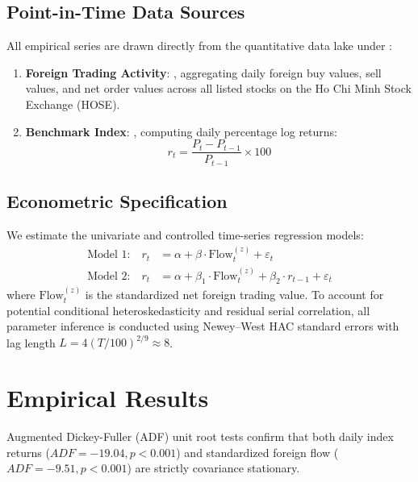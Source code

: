 \documentclass{article}
\begin{document}
\subsection{Point-in-Time Data Sources}
All empirical series are drawn directly from the quantitative data lake under :
\begin{enumerate}
    \item \textbf{Foreign Trading Activity}: , aggregating daily foreign buy values, sell values, and net order values across all listed stocks on the Ho Chi Minh Stock Exchange (HOSE).
    \item \textbf{Benchmark Index}: , computing daily percentage log returns:
    \begin{equation}
        r_t = \frac{P_t - P_{t-1}}{P_{t-1}} \times 100
    \end{equation}
\end{enumerate}

\subsection{Econometric Specification}
We estimate the univariate and controlled time-series regression models:
\begin{align}
    \text{Model 1:} \quad r_t &= \alpha + \beta \cdot \text{Flow}_t^{(z)} + \varepsilon_t \\
    \text{Model 2:} \quad r_t &= \alpha + \beta_1 \cdot \text{Flow}_t^{(z)} + \beta_2 \cdot r_{t-1} + \varepsilon_t
\end{align}
where $\text{Flow}_t^{(z)}$ is the standardized net foreign trading value. To account for potential conditional heteroskedasticity and residual serial correlation, all parameter inference is conducted using Newey--West HAC standard errors \citep{newey1987simple} with lag length $L = 4(T/100)^{2/9} \approx 8$.

\section{Empirical Results}
\label{sec:results}

Augmented Dickey-Fuller (ADF) unit root tests confirm that both daily index returns ($ADF = -19.04, p < 0.001$) and standardized foreign flow ($ADF = -9.51, p < 0.001$) are strictly covariance stationary.
\end{document}
